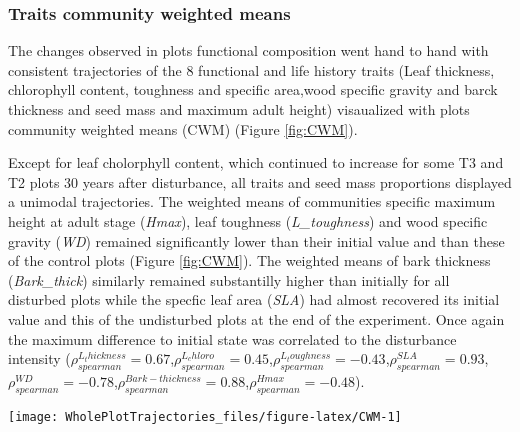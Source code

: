 \documentclass[fleqn,10pt]{ArtEcoFoG} %
\theoremstyle{definition}
\theoremstyle{definition}
\theoremstyle{definition}
\theoremstyle{remark}
\begin{document}
\subsubsection{Traits community weighted
means}\label{traits-community-weighted-means}

The changes observed in plots functional composition went hand to hand
with consistent trajectories of the 8 functional and life history traits
(Leaf thickness, chlorophyll content, toughness and specific area,wood
specific gravity and barck thickness and seed mass and maximum adult
height) visaualized with plots community weighted means (CWM) (Figure
\ref{fig:CWM}).

Except for leaf cholorphyll content, which continued to increase for
some T3 and T2 plots 30 years after disturbance, all traits and seed
mass proportions displayed a unimodal trajectories. The weighted means
of communities specific maximum height at adult stage (\emph{Hmax}),
leaf toughness (\emph{L\_toughness}) and wood specific gravity
(\emph{WD}) remained significantly lower than their initial value and
than these of the control plots (Figure \ref{fig:CWM}). The weighted
means of bark thickness (\emph{Bark\_thick}) similarly remained
substantilly higher than initially for all disturbed plots while the
specfic leaf area (\emph{SLA}) had almost recovered its initial value
and this of the undisturbed plots at the end of the experiment. Once
again the maximum difference to initial state was correlated to the
disturbance intensity
(\(\rho_{spearman}^{L_thickness}=0.67\),\(\rho_{spearman}^{L_chloro}=0.45\),\(\rho_{spearman}^{L_toughness}=-0.43\),\(\rho_{spearman}^{SLA}=0.93\),\(\rho_{spearman}^{WD}=-0.78\),\(\rho_{spearman}^{Bark-thickness}=0.88\),\(\rho_{spearman}^{Hmax}=-0.48\)).

\begin{figure*}

{\centering \texttt{[image: WholePlotTrajectories\_files/figure-latex/CWM-1]} 

}

\caption{Trajectories of the communities weighted means (CWM) over 30 years after disturbance of 4 leaf traits (Leaf thickness, \emph{L\_thickness}, chlorophyll content, \emph{L\_chloro}, toughness, \emph{L\_toughness} and specific area, \emph{SLA}), 2 stem traits (wood specific gravity, \emph{WD}, and bark thickness, \emph{Bark-thick}) and one life trait (Specific maximum height at adult stage, \emph{Hmax}). Trajectories correspond to the median (solid line) and 0.025 and 0.975 percentile (gray envelope) observed after 50 iteration of the taxonomic uncertainty propagation and the missing trait value filling processes. Initial treatments are represented by solid lines colorswith green for control, blue for T1,orange for T2 and red for T3.}\label{fig:CWM}
\end{figure*}
\end{document}
